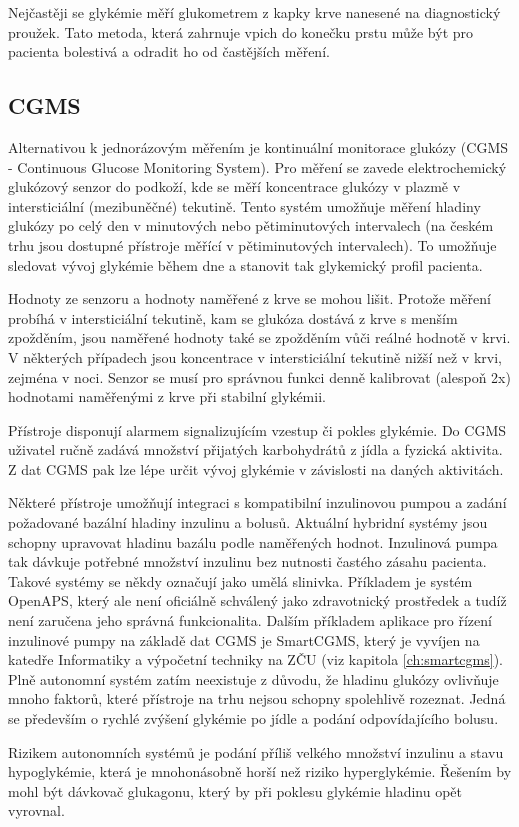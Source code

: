 Nejčastěji se glykémie měří glukometrem z kapky krve nanesené na diagnostický proužek. Tato metoda, která zahrnuje vpich do konečku prstu může být pro pacienta bolestivá a odradit ho od častějších měření. \cite{Diabetes.Pelikan}

\subsection{CGMS}
\label{ch:cgms}

Alternativou k jednorázovým měřením je kontinuální monitorace glukózy (CGMS - Continuous Glucose Monitoring System). Pro měření se zavede elektrochemický glukózový senzor do podkoží, kde se měří koncentrace glukózy v plazmě v intersticiální (mezibuněčné) tekutině. Tento systém umožňuje měření hladiny glukózy po celý den v minutových nebo pětiminutových intervalech (na českém trhu jsou dostupné přístroje měřící v pětiminutových intervalech). To umožňuje sledovat vývoj glykémie během dne a stanovit tak glykemický profil pacienta.

Hodnoty ze senzoru a hodnoty naměřené z krve se mohou lišit. Protože měření probíhá v intersticiální tekutině, kam se glukóza dostává z krve s menším zpožděním, jsou naměřené hodnoty také se zpožděním vůči reálné hodnotě v krvi. V některých případech jsou koncentrace v intersticiální tekutině nižší než v krvi, zejména v noci. Senzor se musí pro správnou funkci denně kalibrovat (alespoň 2x) hodnotami naměřenými z krve při stabilní glykémii. \citep{Diabetes.Perusicova}

Přístroje disponují alarmem signalizujícím vzestup či pokles glykémie. Do CGMS uživatel ručně zadává množství přijatých karbohydrátů z jídla a fyzická aktivita. Z dat CGMS pak lze lépe určit vývoj glykémie v závislosti na daných aktivitách.

Některé přístroje umožňují integraci s kompatibilní inzulinovou pumpou a zadání požadované bazální hladiny inzulinu a bolusů. Aktuální hybridní systémy jsou schopny upravovat hladinu bazálu podle naměřených hodnot. Inzulinová pumpa tak dávkuje potřebné množství inzulinu bez nutnosti častého zásahu pacienta. Takové systémy se někdy označují jako umělá slinivka. Příkladem je systém OpenAPS, který ale není oficiálně schválený jako zdravotnický prostředek a tudíž není zaručena jeho správná funkcionalita. Dalším příkladem aplikace pro řízení inzulinové pumpy na základě dat CGMS je SmartCGMS, který je vyvíjen na katedře Informatiky a výpočetní techniky na ZČU (viz kapitola \ref{ch:smartcgms}). Plně autonomní systém zatím neexistuje z důvodu, že hladinu glukózy ovlivňuje mnoho faktorů, které přístroje na trhu nejsou schopny spolehlivě rozeznat. Jedná se především o rychlé zvýšení glykémie po jídle a podání odpovídajícího bolusu.

Rizikem autonomních systémů je podání příliš velkého množství inzulinu a stavu hypoglykémie, která je mnohonásobně horší než riziko hyperglykémie. Řešením by mohl být dávkovač glukagonu, který by při poklesu glykémie hladinu opět vyrovnal. %